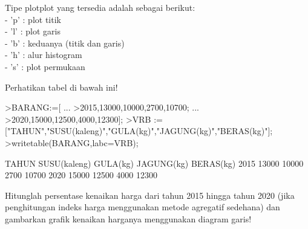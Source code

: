 \documentclass[a4paper,10pt]{article}
\begin{document}
\begin{eulernotebook}
\begin{eulercomment}
\begin{eulercomment}
\begin{eulercomment}
\begin{eulercomment}
\begin{eulercomment}
\begin{eulercomment}
\begin{eulercomment}
\begin{eulercomment}
\begin{eulercomment}
\begin{eulercomment}
\begin{eulercomment}
\begin{eulercomment}
\begin{eulercomment}
\begin{eulercomment}
\begin{eulercomment}
\begin{eulercomment}
\begin{eulercomment}
Tipe plotplot yang tersedia adalah sebagai berikut:\\
- 'p' : plot titik\\
- 'l' : plot garis\\
- 'b' : keduanya (titik dan garis)\\
- 'h' : alur histogram\\
- 's' : plot permukaan
\end{eulercomment}
\eulersubheading{}
\begin{eulercomment}
Perhatikan tabel di bawah ini!
\end{eulercomment}
\begin{eulerprompt}
>BARANG:=[ ...
>2015,13000,10000,2700,10700; ...
>2020,15000,12500,4000,12300];
>VRB := ["TAHUN","SUSU(kaleng)","GULA(kg)","JAGUNG(kg)","BERAS(kg)"];
>writetable(BARANG,labc=VRB);
\end{eulerprompt}
\begin{euleroutput}
       TAHUN SUSU(kaleng)  GULA(kg) JAGUNG(kg) BERAS(kg)
        2015        13000     10000       2700     10700
        2020        15000     12500       4000     12300
\end{euleroutput}
\begin{eulercomment}
Hitunglah persentase kenaikan harga dari tahun 2015 hingga tahun 2020
(jika penghitungan indeks harga menggunakan metode agregatif sedehana)
dan gambarkan grafik kenaikan harganya menggunakan diagram garis!


\end{eulercomment}
\end{eulercomment}
\end{eulercomment}
\end{eulercomment}
\end{eulercomment}
\end{eulercomment}
\end{eulercomment}
\end{eulercomment}
\end{eulercomment}
\end{eulercomment}
\end{eulercomment}
\end{eulercomment}
\end{eulercomment}
\end{eulercomment}
\end{eulercomment}
\end{eulercomment}
\end{eulercomment}
\end{eulernotebook}
\end{document}
